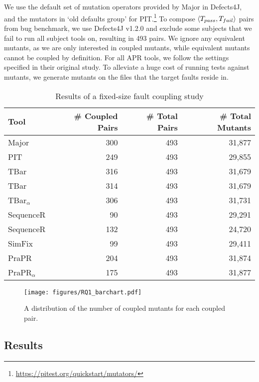 \documentclass[conference]{IEEEtran}
\def\d4j{Defects4J\xspace}
\newcommand\inv[1]{#1\raisebox{1.15ex}{$\scriptscriptstyle-\!1$}}
\begin{document}
We use the default set of mutation operators provided by Major in \d4j, and the
mutators in `old defaults group' for
PIT.\footnote{\url{https://pitest.org/quickstart/mutators/}} To compose
$\braket{T_{pass}, T_{fail}}$ pairs from bug benchmark, we use \d4j v1.2.0 and
exclude some subjects that we fail to run all subject tools on, resulting in 493
pairs. We ignore any equivalent mutants, as we are only interested in coupled
mutants, while equivalent mutants cannot be coupled by definition. For all APR
tools, we follow the settings specified in their original study. To alleviate a
huge cost of running tests against mutants, we generate mutants on
the files that the target faults reside in.


\begin{table}[ht!]
    \centering
    \caption{Results of a fixed-size fault coupling study}
    \label{tab:RQ3_results_sampled}
    \begin{tabular}{lrrr}
        \toprule
        Tool & \# Coupled Pairs & \# Total Pairs & \# Total Mutants  \\
        \midrule
    
    
Major & 300 & 493 & 31,877 \\
PIT & 249 & 493 & 29,855 \\
TBar & 316 & 493 & 31,679 \\
\inv{TBar} & 314 & 493 & 31,679 \\
TBar$_{\alpha}$ & 306 & 493 & 31,731 \\
SequenceR  & 90 & 493 & 29,291 \\
\inv{SequenceR} & 132 & 493 & 24,720 \\
SimFix & 99 & 493 & 29,411 \\
PraPR & 204 & 493 & 31,874 \\
PraPR$_{\alpha}$ & 175 & 493 & 31,877 \\
    
        \bottomrule
    \end{tabular}
\end{table}

\begin{figure}[!ht]
    \centering        
        \texttt{[image: figures/RQ1\_barchart.pdf]}
    \caption{A distribution of the number of coupled mutants for each coupled pair.}
    \label{fig:RQ1_barchart}    
\end{figure}

\subsection{Results}
\label{sec:RQ3_results}
\end{document}
